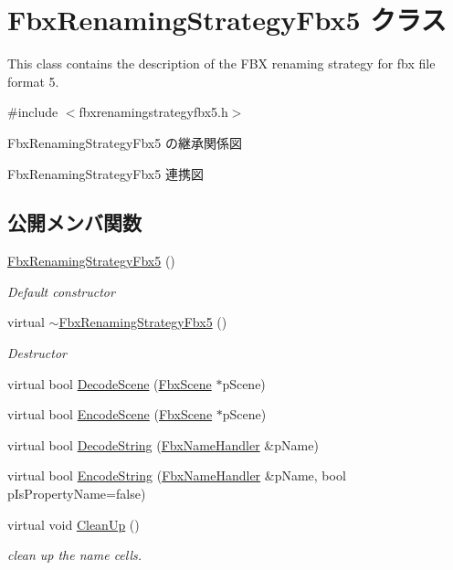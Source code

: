 \hypertarget{class_fbx_renaming_strategy_fbx5}{}\section{Fbx\+Renaming\+Strategy\+Fbx5 クラス}
\label{class_fbx_renaming_strategy_fbx5}


This class contains the description of the F\+BX renaming strategy for fbx file format 5.  




{\ttfamily \#include $<$fbxrenamingstrategyfbx5.\+h$>$}



Fbx\+Renaming\+Strategy\+Fbx5 の継承関係図


Fbx\+Renaming\+Strategy\+Fbx5 連携図
\subsection*{公開メンバ関数}
\begin{DoxyCompactItemize}
\item 
\hyperlink{class_fbx_renaming_strategy_fbx5_a4495cfe87ae05a9bc3e8d50858ab46d0}{Fbx\+Renaming\+Strategy\+Fbx5} ()
\begin{DoxyCompactList}\small\item\em Default constructor \end{DoxyCompactList}\item 
virtual \hyperlink{class_fbx_renaming_strategy_fbx5_a3c6e6645362d6a0042e5458396ae4609}{$\sim$\+Fbx\+Renaming\+Strategy\+Fbx5} ()
\begin{DoxyCompactList}\small\item\em Destructor \end{DoxyCompactList}\item 
virtual bool \hyperlink{class_fbx_renaming_strategy_fbx5_a3af6482297f78deb29a48a9f26ded270}{Decode\+Scene} (\hyperlink{class_fbx_scene}{Fbx\+Scene} $\ast$p\+Scene)
\item 
virtual bool \hyperlink{class_fbx_renaming_strategy_fbx5_a559a5b6e57b4ac39b09aaa13fa021ab9}{Encode\+Scene} (\hyperlink{class_fbx_scene}{Fbx\+Scene} $\ast$p\+Scene)
\item 
virtual bool \hyperlink{class_fbx_renaming_strategy_fbx5_a10862b9d829203cdb2810c2f42c844ee}{Decode\+String} (\hyperlink{class_fbx_name_handler}{Fbx\+Name\+Handler} \&p\+Name)
\item 
virtual bool \hyperlink{class_fbx_renaming_strategy_fbx5_adcd74ccce2269d962b5bd8e8600c472c}{Encode\+String} (\hyperlink{class_fbx_name_handler}{Fbx\+Name\+Handler} \&p\+Name, bool p\+Is\+Property\+Name=false)
\item 
virtual void \hyperlink{class_fbx_renaming_strategy_fbx5_a581d1d5e0b4fcc9f9702be12669fc795}{Clean\+Up} ()
\begin{DoxyCompactList}\small\item\em clean up the name cells. \end{DoxyCompactList}\end{DoxyCompactItemize}
